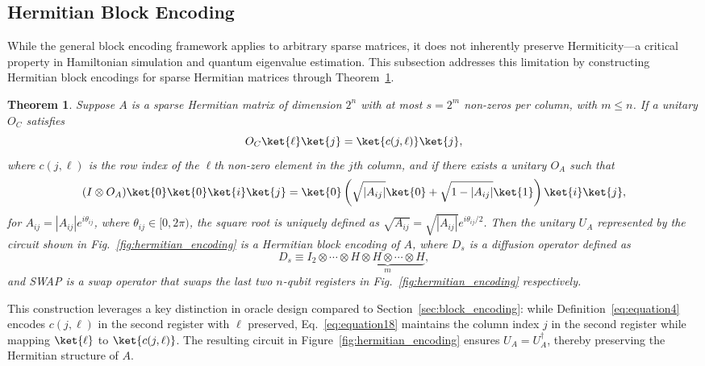 \documentclass{article}
\newtheorem{theorem}{Theorem}[section]
\begin{document}
\subsection{Hermitian Block Encoding}

While the general block encoding framework applies to arbitrary sparse matrices, it does not inherently preserve Hermiticity—a critical property in Hamiltonian simulation and quantum eigenvalue estimation. This subsection addresses this limitation by constructing Hermitian block encodings for sparse Hermitian matrices through Theorem~\ref{thm:main_result2}.

\begin{theorem}
  Suppose $A$ is a sparse Hermitian matrix of dimension $2^n$ with at most $s = 2^m$ non-zeros per column, with $m \leq n$. If a unitary $O_C$ satisfies
  \begin{equation}
    O_C \ket{\ell} \ket{j} = \ket{c(j, \ell)} \ket{j},\label{eq:equation18}
  \end{equation}
  where $c(j, \ell)$ is the row index of the $\ell$th non-zero element in the $j$th column, and if there exists a unitary $O_A$ such that
  \begin{equation}
    (I \otimes O_A) \ket{0} \ket{0} \ket{i} \ket{j} = \ket{0} \left( \sqrt{|A_{ij}|} \ket{0} + \sqrt{1 - |A_{ij}|} \ket{1} \right) \ket{i} \ket{j},
  \end{equation}
  for $A_{ij} = |A_{ij}| e^{i \theta_{ij}}$, where $\theta_{ij} \in [0, 2\pi)$, the square root is uniquely defined as $\sqrt{A_{ij}} = \sqrt{|A_{ij}|} e^{i \theta_{ij}/2}$. Then the unitary $U_A$ represented by the circuit shown in Fig.~\ref{fig:hermitian_encoding} is a Hermitian block encoding of $A$, where $D_s$ is a diffusion operator defined as
  \begin{equation}
    D_s \equiv I_2 \otimes \cdots \otimes
    \underbrace{H \otimes H \otimes \cdots \otimes H}_{m},
  \end{equation}
  and SWAP is a swap operator that swaps the last two $n$-qubit registers in Fig.~\ref{fig:hermitian_encoding} respectively.
  \label{thm:main_result2}
\end{theorem}

This construction leverages a key distinction in oracle design compared to Section~\ref{sec:block_encoding}: while Definition~\ref{eq:equation4} encodes $c(j, \ell)$ in the second register with $\ell$ preserved, Eq.~\ref{eq:equation18} maintains the column index $j$ in the second register while mapping $\ket{\ell}$ to $\ket{c(j, \ell)}$. The resulting circuit in Figure~\ref{fig:hermitian_encoding} ensures $U_A = U_A^\dagger$, thereby preserving the Hermitian structure of $A$.
\end{document}
